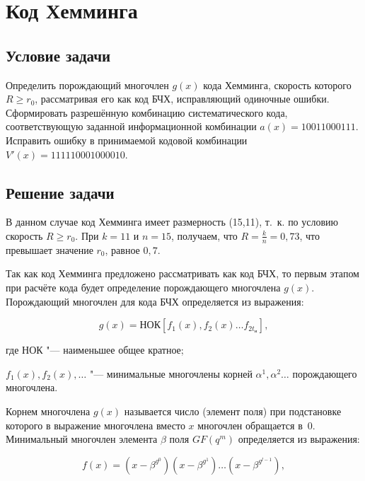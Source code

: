 \section{Код Хемминга}
\label{sec:hemming}

\subsection{Условие задачи}

Определить порождающий многочлен $g(x)$ кода Хемминга, скорость
которого $R \geqslant r_0$, рассматривая его как код БЧХ, исправляющий
одиночные ошибки. Сформировать разрешённую комбинацию систематического
кода, соответствующую заданной информационной комбинации $a(x) =
10011000111$. Исправить ошибку в принимаемой кодовой комбинации
$V'(x) = 111110001000010$.

\subsection{Решение задачи}

В данном случае код Хемминга имеет размерность (15,11), т.~к. по
условию скорость $R \geqslant r_0$. При $k = 11$ и $n = 15$, получаем,
что $R = \frac{k}{n} = 0{,}73$, что превышает значение $r_0$, равное
$0{,}7$.

Так как код Хемминга предложено рассматривать как код БЧХ, то первым
этапом при расчёте кода будет определение порождающего многочлена
$g(x)$. Порождающий многочлен для кода БЧХ определяется из выражения:

\begin{equation*}
  g(x) = \text{НОК}\left[f_1(x), f_2(x) \ldots f_{2t_{\text{и}}} \right],
\end{equation*}

\begin{ESKDexplanation}
\item[где ] НОК "--- наименьшее общее кратное;
\item $f_1(x), f_2(x), \ldots$ "--- минимальные многочлены корней
  $\alpha^1, \alpha^2 \ldots$ порождающего многочлена.
\end{ESKDexplanation}

Корнем многочлена $g(x)$ называется число (элемент поля) при
подстановке которого в выражение многочлена вместо $x$ многочлен
обращается в~0. Минимальный многочлен элемента $\beta$ поля $GF(q^m)$
определяется из выражения:

\begin{equation*}
  f(x) = (x - \beta^{g^0})(x - \beta^{g^1}) \ldots (x - \beta^{g^{l-1}}),
\end{equation*}

